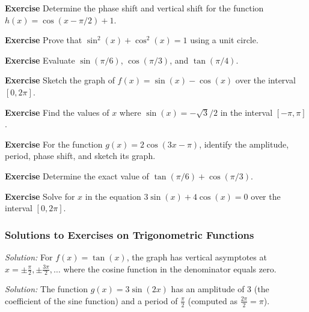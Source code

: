 \documentclass[a4paper,12pt]{book}
\newenvironment{exercise}[1][]
  {\par\medskip\noindent\textbf{Exercise #1} \rmfamily}
  {\medskip}
\newenvironment{solution}[1][]
{\par\noindent\textit{Solution:} \rmfamily}{\medskip}
\begin{document}
\begin{exercise}
Determine the phase shift and vertical shift for the function \( h(x) = \cos(x - \pi/2) + 1 \).
\end{exercise}

\begin{exercise}
Prove that \( \sin^2(x) + \cos^2(x) = 1 \) using a unit circle.
\end{exercise}

\begin{exercise}
Evaluate \( \sin(\pi/6) \), \( \cos(\pi/3) \), and \( \tan(\pi/4) \).
\end{exercise}

\begin{exercise}
Sketch the graph of \( f(x) = \sin(x) - \cos(x) \) over the interval \([0, 2\pi]\).
\end{exercise}

\begin{exercise}
Find the values of \( x \) where \( \sin(x) = -\sqrt{3}/2 \) in the interval \([-\pi, \pi]\).
\end{exercise}

\begin{exercise}
For the function \( g(x) = 2\cos(3x - \pi) \), identify the amplitude, period, phase shift, and sketch its graph.
\end{exercise}

\begin{exercise}
Determine the exact value of \( \tan(\pi/6) + \cos(\pi/3) \).
\end{exercise}

\begin{exercise}
Solve for \( x \) in the equation \( 3\sin(x) + 4\cos(x) = 0 \) over the interval \([0, 2\pi]\).
\end{exercise}

\subsubsection*{Solutions to Exercises on Trigonometric Functions}

\begin{solution}[1]
For \( f(x) = \tan(x) \), the graph has vertical asymptotes at \( x = \pm \frac{\pi}{2}, \pm \frac{3\pi}{2}, \ldots \) where the cosine function in the denominator equals zero.
\end{solution}

\begin{solution}[2]
The function \( g(x) = 3\sin(2x) \) has an amplitude of 3 (the coefficient of the sine function) and a period of \( \frac{\pi}{2} \) (computed as \( \frac{2\pi}{2} = \pi \)).
\end{solution}
\end{document}
